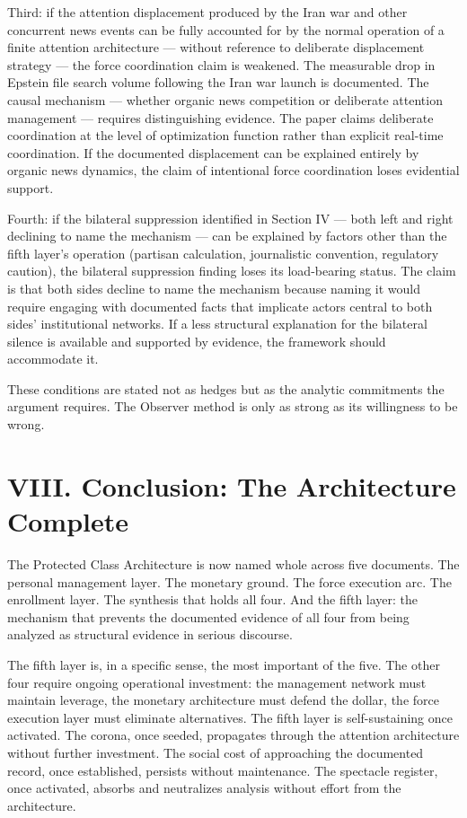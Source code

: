 \documentclass[11pt,a4paper]{article}
\begin{document}
Third: if the attention displacement produced by the Iran war and other concurrent news events can be fully accounted for by the normal operation of a finite attention architecture — without reference to deliberate displacement strategy — the force coordination claim is weakened. The measurable drop in Epstein file search volume following the Iran war launch is documented. The causal mechanism — whether organic news competition or deliberate attention management — requires distinguishing evidence. The paper claims deliberate coordination at the level of optimization function rather than explicit real-time coordination. If the documented displacement can be explained entirely by organic news dynamics, the claim of intentional force coordination loses evidential support.


Fourth: if the bilateral suppression identified in Section IV — both left and right declining to name the mechanism — can be explained by factors other than the fifth layer's operation (partisan calculation, journalistic convention, regulatory caution), the bilateral suppression finding loses its load-bearing status. The claim is that both sides decline to name the mechanism because naming it would require engaging with documented facts that implicate actors central to both sides' institutional networks. If a less structural explanation for the bilateral silence is available and supported by evidence, the framework should accommodate it.


These conditions are stated not as hedges but as the analytic commitments the argument requires. The Observer method is only as strong as its willingness to be wrong.


\section{VIII. Conclusion: The Architecture Complete}

The Protected Class Architecture is now named whole across five documents. The personal management layer. The monetary ground. The force execution arc. The enrollment layer. The synthesis that holds all four. And the fifth layer: the mechanism that prevents the documented evidence of all four from being analyzed as structural evidence in serious discourse.


The fifth layer is, in a specific sense, the most important of the five. The other four require ongoing operational investment: the management network must maintain leverage, the monetary architecture must defend the dollar, the force execution layer must eliminate alternatives. The fifth layer is self-sustaining once activated. The corona, once seeded, propagates through the attention architecture without further investment. The social cost of approaching the documented record, once established, persists without maintenance. The spectacle register, once activated, absorbs and neutralizes analysis without effort from the architecture.
\end{document}
